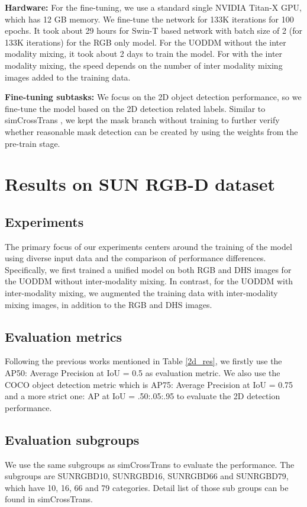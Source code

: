 \documentclass[]{modified_llncs}
\begin{document}
\textbf{Hardware:} For the fine-tuning, we use a standard single NVIDIA Titan-X GPU, which has 12 GB memory. We fine-tune the network for 133K iterations for 100 epochs. It took about 29 hours for Swin-T based network with batch size of 2 (for 133K iterations) for the RGB only model. For the UODDM without the inter modality mixing, it took about 2 days to train the model. For with the inter modality mixing, the speed depends on the number of inter modality mixing images added to the training data. 

\textbf{Fine-tuning subtasks:} We focus on the 2D object detection performance, so we fine-tune the model based on the 2D detection related labels. Similar to simCrossTrans \cite{simCrossTrans_cite}, we kept the mask branch without training to further verify whether reasonable mask detection can be created by using the weights from the pre-train stage.
\section{Results on SUN RGB-D dataset}
\subsection{Experiments}
The primary focus of our experiments centers around the training of the model using diverse input data and the comparison of performance differences. Specifically, we first trained a unified model on both RGB and DHS images for the UODDM without inter-modality mixing. In contrast, for the UODDM with inter-modality mixing, we augmented the training data with inter-modality mixing images, in addition to the RGB and DHS images.
\subsection{Evaluation metrics} Following the previous works mentioned in Table \ref{2d_res}, we firstly use the AP50: Average Precision at IoU = 0.5 as evaluation metric. We also use the COCO object detection metric which is AP75: Average Precision at IoU = 0.75 and a more strict one: AP at IoU = .50:.05:.95 to evaluate the 2D detection performance. 
\subsection{Evaluation subgroups} 
We use the same subgroups as simCrossTrans\cite{simCrossTrans_cite} to evaluate the performance. The subgroups are SUNRGBD10, SUNRGBD16, SUNRGBD66 and  SUNRGBD79, which have 10, 16, 66 and 79 categories. Detail list of those sub groups can be found in simCrossTrans\cite{simCrossTrans_cite}.
\end{document}
